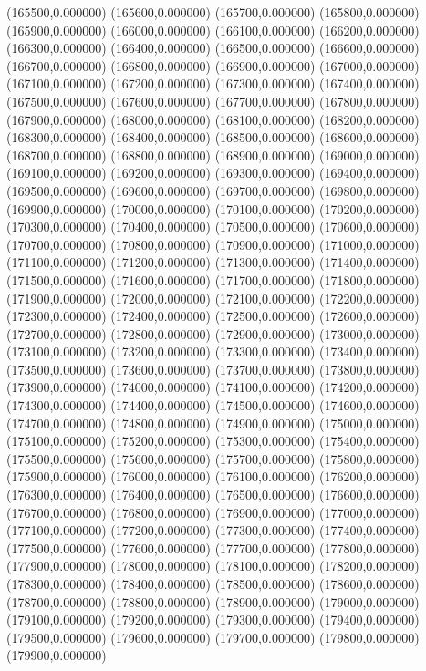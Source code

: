 (165500,0.000000)
(165600,0.000000)
(165700,0.000000)
(165800,0.000000)
(165900,0.000000)
(166000,0.000000)
(166100,0.000000)
(166200,0.000000)
(166300,0.000000)
(166400,0.000000)
(166500,0.000000)
(166600,0.000000)
(166700,0.000000)
(166800,0.000000)
(166900,0.000000)
(167000,0.000000)
(167100,0.000000)
(167200,0.000000)
(167300,0.000000)
(167400,0.000000)
(167500,0.000000)
(167600,0.000000)
(167700,0.000000)
(167800,0.000000)
(167900,0.000000)
(168000,0.000000)
(168100,0.000000)
(168200,0.000000)
(168300,0.000000)
(168400,0.000000)
(168500,0.000000)
(168600,0.000000)
(168700,0.000000)
(168800,0.000000)
(168900,0.000000)
(169000,0.000000)
(169100,0.000000)
(169200,0.000000)
(169300,0.000000)
(169400,0.000000)
(169500,0.000000)
(169600,0.000000)
(169700,0.000000)
(169800,0.000000)
(169900,0.000000)
(170000,0.000000)
(170100,0.000000)
(170200,0.000000)
(170300,0.000000)
(170400,0.000000)
(170500,0.000000)
(170600,0.000000)
(170700,0.000000)
(170800,0.000000)
(170900,0.000000)
(171000,0.000000)
(171100,0.000000)
(171200,0.000000)
(171300,0.000000)
(171400,0.000000)
(171500,0.000000)
(171600,0.000000)
(171700,0.000000)
(171800,0.000000)
(171900,0.000000)
(172000,0.000000)
(172100,0.000000)
(172200,0.000000)
(172300,0.000000)
(172400,0.000000)
(172500,0.000000)
(172600,0.000000)
(172700,0.000000)
(172800,0.000000)
(172900,0.000000)
(173000,0.000000)
(173100,0.000000)
(173200,0.000000)
(173300,0.000000)
(173400,0.000000)
(173500,0.000000)
(173600,0.000000)
(173700,0.000000)
(173800,0.000000)
(173900,0.000000)
(174000,0.000000)
(174100,0.000000)
(174200,0.000000)
(174300,0.000000)
(174400,0.000000)
(174500,0.000000)
(174600,0.000000)
(174700,0.000000)
(174800,0.000000)
(174900,0.000000)
(175000,0.000000)
(175100,0.000000)
(175200,0.000000)
(175300,0.000000)
(175400,0.000000)
(175500,0.000000)
(175600,0.000000)
(175700,0.000000)
(175800,0.000000)
(175900,0.000000)
(176000,0.000000)
(176100,0.000000)
(176200,0.000000)
(176300,0.000000)
(176400,0.000000)
(176500,0.000000)
(176600,0.000000)
(176700,0.000000)
(176800,0.000000)
(176900,0.000000)
(177000,0.000000)
(177100,0.000000)
(177200,0.000000)
(177300,0.000000)
(177400,0.000000)
(177500,0.000000)
(177600,0.000000)
(177700,0.000000)
(177800,0.000000)
(177900,0.000000)
(178000,0.000000)
(178100,0.000000)
(178200,0.000000)
(178300,0.000000)
(178400,0.000000)
(178500,0.000000)
(178600,0.000000)
(178700,0.000000)
(178800,0.000000)
(178900,0.000000)
(179000,0.000000)
(179100,0.000000)
(179200,0.000000)
(179300,0.000000)
(179400,0.000000)
(179500,0.000000)
(179600,0.000000)
(179700,0.000000)
(179800,0.000000)
(179900,0.000000)
